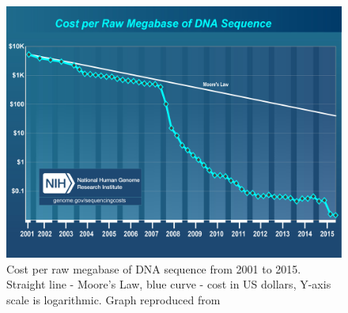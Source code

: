 \chapter{}
\begin{figure}[hb!]
\begin{center}
\includegraphics[scale=0.5]{costperMb2015_4.jpg}
\end{center}
\caption[Cost per raw megabase of DNA sequence from 2001 to 2015]{Cost per raw megabase of DNA sequence from 2001 to 2015. Straight line - Moore's Law, blue curve - cost in US dollars, Y-axis scale is logarithmic. Graph reproduced from \citep{wetterstrand2016}}
\end{figure}

